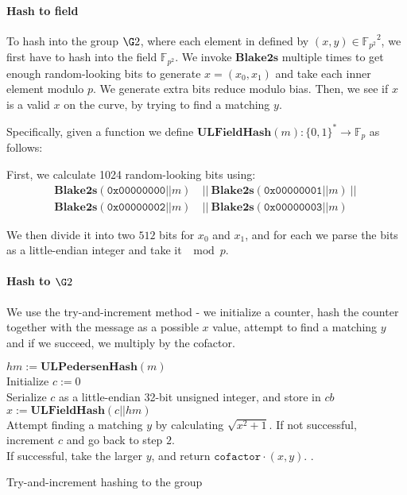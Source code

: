 \documentclass[11pt]{article}
\numberwithin{figure}{section} %
\newcommand{\Fp}{\ensuremath{\mathbb{F}_p}\xspace}
\newcommand{\Fptwo}{\ensuremath{\mathbb{F}_{p^2}}\xspace}
\newcommand{\ulphash}{\ensuremath{\mathbf{ULPedersenHash}}\xspace}
\newcommand{\bhash}{\ensuremath{\mathbf{Blake2s}}\xspace}
\newcommand{\ulfieldhash}{\ensuremath{\mathbf{ULFieldHash}}\xspace}
\begin{document}
\paragraph{Hash to field}
To hash into the group $\G2$, where each element in defined by $(x,y) \in \Fptwo^2$, we first have to hash into the field $\Fptwo$. We invoke $\bhash$ multiple times to get enough random-looking bits to generate $x = (x_0, x_1)$ and take each inner element modulo $p$. We generate extra bits reduce modulo bias. Then, we see if $x$ is a valid $x$ on the curve, by trying to find a matching $y$.

Specifically, given a function we define $\ulfieldhash(m): \{0,1\}^* \rightarrow \Fp$ as follows:

First, we calculate 1024 random-looking bits using:
\begin{align*}
\bhash(\texttt{0x00000000} || m) &\ ||\ \bhash(\texttt{0x00000001} || m)\ ||\ \\
\bhash(\texttt{0x00000002} || m) &\ ||\ \bhash(\texttt{0x00000003} || m)
\end{align*}

We then divide it into two $512$ bits for $x_0$ and $x_1$, and for each we parse the bits as a little-endian integer and take it $\mod p$.

\paragraph{Hash to $\G2$}
We use the try-and-increment method - we initialize a counter, hash the counter together with the message as a possible $x$ value, attempt to find a matching $y$ and if we succeed, we multiply by the cofactor.

\begin{algorithm}
	$hm := \ulphash(m)$ \\
	Initialize $c := 0$ \\
	Serialize $c$ as a little-endian 32-bit unsigned integer, and store in $cb$ \\
	$x := \ulfieldhash(c || hm)$ \\
	Attempt finding a matching $y$ by calculating $\sqrt{x^2 + 1}$. If not successful, increment $c$ and go back to step $2$. \\
	If successful, take the larger $y$, and return $\mathtt{cofactor} \cdot (x, y)$.
	.
	
	\caption{Try-and-increment hashing to the group}
\end{algorithm}




\end{document}

